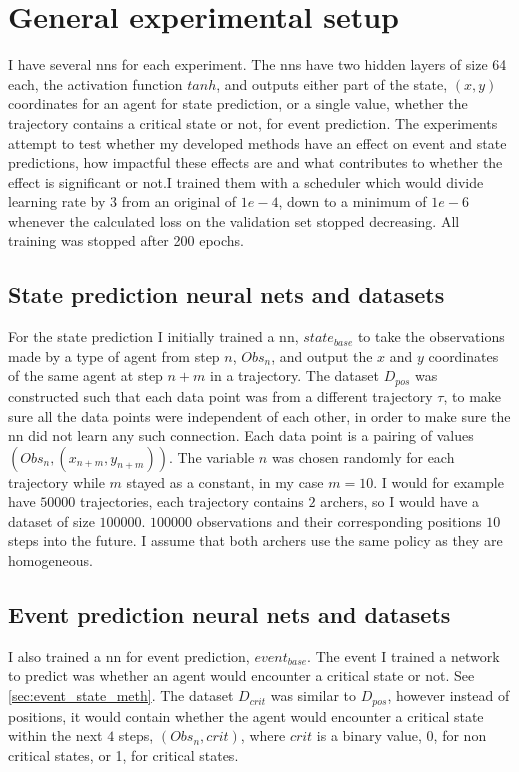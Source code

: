 \documentclass[UKenglish]{uiomasterthesis}
\begin{document}
\section{General experimental setup}
I have several \acp{nn} for each experiment. The \acp{nn} have two hidden layers of size 64 each, the activation function $tanh$, and outputs either part of the state, $(x,y)$ coordinates for an agent for state prediction, or a single value, whether the trajectory contains a critical state or not, for event prediction. The experiments attempt to test whether my developed methods have an effect on event and state predictions, how impactful these effects are and what contributes to whether the effect is significant or not.I trained them with a scheduler which would divide learning rate by $3$ from an original of $1e-4$, down to a minimum of $1e-6$ whenever the calculated loss on the validation set stopped decreasing. All training was stopped after 200 epochs.

\subsection{State prediction neural nets and datasets}
For the state prediction I initially trained a \ac{nn}, $state_{base}$ to take the observations made by a type of agent from step $n$, $Obs_n$, and output the $x$ and $y$ coordinates of the same agent at step $n+m$ in a trajectory. The dataset $D_{pos}$ was constructed such that each data point was from a different trajectory $\tau$, to make sure all the data points were independent of each other, in order to make sure the \ac{nn} did not learn any such connection. Each data point is a pairing of values $(Obs_n, (x_{n+m},y_{n+m}))$. The variable $n$ was chosen randomly for each trajectory while $m$ stayed as a constant, in my case $m=10$. I would for example have $50000$ trajectories, each trajectory contains $2$ archers, so I would have a dataset of size $100000$. $100000$ observations and their corresponding positions $10$ steps into the future. I assume that both archers use the same policy as they are homogeneous.

\subsection{Event prediction neural nets and datasets}
I also trained a \ac{nn} for event prediction, $event_{base}$. The event I trained a network to predict was whether an agent would encounter a critical state or not. See \cref{sec:event_state_meth}. The dataset $D_{crit}$ was similar to $D_{pos}$, however instead of positions, it would contain whether the agent would encounter a critical state within the next $4$ steps, $(Obs_n, crit)$, where $crit$ is a binary value, 0, for non critical states, or 1, for critical states.
\end{document}

